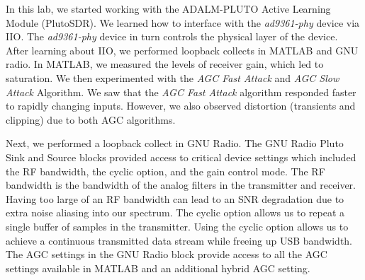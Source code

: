 \documentclass{article}
\begin{document}
In this lab, we started working with the ADALM-PLUTO Active Learning Module (PlutoSDR). We learned how to interface with the \textit{ad9361-phy} device via IIO. The \textit{ad9361-phy} device in turn controls the physical layer of the device. After learning about IIO, we performed loopback collects in MATLAB and GNU radio. In MATLAB, we measured the levels of receiver gain, which led to saturation. We then experimented with the \textit{AGC Fast Attack} and \textit{AGC Slow Attack} Algorithm. We saw that the \textit{AGC Fast Attack} algorithm responded faster to rapidly changing inputs. However, we also observed distortion (transients and clipping) due to both AGC algorithms.

Next, we performed a loopback collect in GNU Radio. The GNU Radio Pluto Sink and Source blocks provided access to critical device settings which included the RF bandwidth, the cyclic option, and the gain control mode. The RF bandwidth is the bandwidth of the analog filters in the transmitter and receiver. Having too large of an RF bandwidth can lead to an SNR degradation due to extra noise aliasing into our spectrum. The cyclic option allows us to repeat a single buffer of samples in the transmitter. Using the cyclic option allows us to achieve a continuous transmitted data stream while freeing up USB bandwidth. The AGC settings in the GNU Radio block provide access to all the AGC settings available in MATLAB and an additional hybrid AGC setting.



\nocite{analog_devices_libiio_error}

{}
%
	
\end{document}
